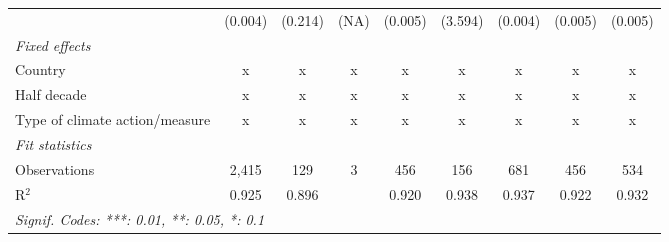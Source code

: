 \begin{table}[htbp]
\begin{tabular}{lcccccccc}
                                                                    & (0.004)       & (0.214)                   & (NA)         & (0.005)        & (3.594)          & (0.004)         & (0.005)         & (0.005)\\   
      \emph{Fixed effects}\\
      Country                                                       & x             & x                         & x            & x              & x                & x               & x               & x\\  
      Half decade                                                   & x             & x                         & x            & x              & x                & x               & x               & x\\  
      Type of climate action/measure                                & x             & x                         & x            & x              & x                & x               & x               & x\\  
      \midrule \emph{Fit statistics}\\
      Observations                                                  & 2,415         & 129                       & 3            & 456            & 156              & 681             & 456             & 534\\  
      R$^2$                                                         & 0.925         & 0.896                     &              & 0.920          & 0.938            & 0.937           & 0.922           & 0.932\\  
      \midrule
      \multicolumn{9}{l}{\emph{Signif. Codes: ***: 0.01, **: 0.05, *: 0.1}}\\
   \end{tabular}
\end{table}


